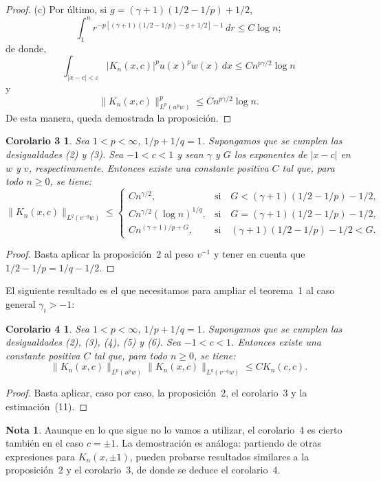 \documentclass[a4paper,12pt]{article}
\theoremstyle{plain}
\newtheorem*{corThree}{Corolario 3}
\newtheorem*{corFour}{Corolario 4}
\theoremstyle{definition}
\newtheorem*{note}{Nota}
\begin{document}
\begin{proof}
    (c) Por \'ultimo, si $g = (\gamma +1) (1/2 - 1/p) + 1/2$,
$$
\int_{1}^{n} r^{-p [ (\gamma+1)(1/2 - 1/p) - g+1/2 ] -1} \,dr \leq C \log n;
$$
de donde,
$$
\int_{| x - c | < \varepsilon} | K_{n}(x,c) |^{p} u(x)^{p} w(x)\,dx
\leq C n^{p\gamma/2} \log n
$$
y
$$
\| K_{n}(x,c) \|^{p}_{L^{p}(u^{p}w)} \leq C n^{p\gamma/2} \log n.
$$
De esta manera, queda demostrada la proposici\'on.
\end{proof}

\begin{corThree}
Sea $1 < p < \infty$, $1/p + 1/q = 1$.
Supongamos que se cumplen las desigualdades (2) y (3). Sea $-1 < c < 1$
y sean $\gamma$ y $G$ los exponentes de $| x - c |$
en $w$ y $v$, respectivamente. Entonces existe una constante positiva
$C$ tal que, para todo $n \geq 0$, se tiene:
$$
\| K_{n}(x,c) \|_{L^{q}(v^{-q}w)}
\leq
\begin{cases}
C n^{\gamma/2}, &\text{si}\quad G < (\gamma +1) (1/2 - 1/p) - 1/2,\\
C n^{\gamma/2} (\log n)^{1/q}, &\text{si}\quad G = (\gamma +1) (1/2 - 1/p) - 1/2,\\
C n^{(\gamma+1)/p + G}, &\text{si}\quad (\gamma +1) (1/2 - 1/p) - 1/2 < G.
\end{cases}
$$
\end{corThree}

\begin{proof}
Basta aplicar la proposici\'on~2 al peso $v^{-1}$ y tener en cuenta
que $1/2 - 1/p = 1/q - 1/2$.
\end{proof}

El siguiente resultado es el que necesitamos para ampliar el
teorema~1 al caso general $\gamma_{i} > -1$:

\begin{corFour}
Sea $1 < p < \infty$, $1/p + 1/q = 1$.
Supongamos que se cumplen las desigualdades (2), (3), (4), (5)
y (6). Sea $-1 < c < 1$.
Entonces existe una constante positiva $C$ tal que, para todo $n \geq 0$,
se tiene:
$$
\| K_{n}(x,c) \|_{L^{p}(u^{p}w)} \| K_{n}(x,c) \|_{L^{q}(v^{-q}w)}
\leq C K_{n}(c,c).
$$
\end{corFour}

\begin{proof}
Basta aplicar, caso por caso, la proposici\'on~2, el corolario~3
y la estimaci\'on~(11).
\end{proof}

\begin{note}
Aaunque en lo que sigue no lo vamos a utilizar, el corolario~4 es cierto
tambi\'{e}n en el caso $c = \pm 1$.
La demostraci\'on es an\'aloga: partiendo de otras expresiones
para $K_{n}(x,\pm 1)$, pueden probarse
resultados similares a la proposici\'on~2 y el corolario~3, de
donde se deduce el corolario~4.
\end{note}
\end{document}
